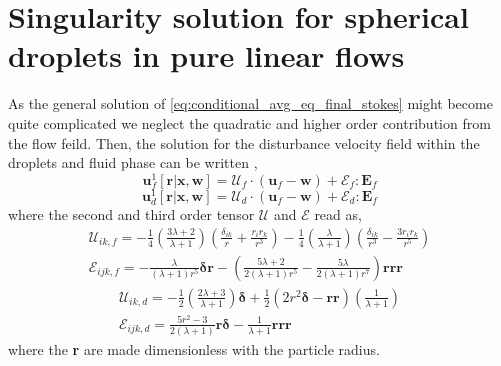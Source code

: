 
\section{Singularity solution for spherical droplets in pure linear flows}
\label{ap:solution_singularity}

As the general solution of \ref{eq:conditional_avg_eq_final_stokes} might become quite complicated we neglect the quadratic and higher order contribution from the flow feild. 
Then, the solution for the disturbance velocity field within the droplets and fluid phase can be written \citep{leal2007advanced}, 
\begin{equation}
    \textbf{u}_f^1[\textbf{r}|\textbf{x},\textbf{w}]
    = 
    \mathcal{U}_f\cdot (\textbf{u}_f - \textbf{w})
    + \mathcal{E}_f: \textbf{E}_{f}
\end{equation}
\begin{equation}
    \textbf{u}_d^1[\textbf{r}|\textbf{x},\textbf{w}]
    = 
    \mathcal{U}_d\cdot (\textbf{u}_f - \textbf{w})
    + \mathcal{E}_d: \textbf{E}_{f}
\end{equation}
where the second and third order tensor $\mathcal{U}$ and $\mathcal{E}$ read as, 
\begin{align}
    \mathcal{U}_{ik,f} = 
    -\frac{1}{4}\left(\frac{3\lambda + 2}{\lambda +1}\right)
    \left(\frac{\delta_{ik}}{r} + \frac{r_ir_k}{r^3}\right) 
    - 
    \frac{1}{4}\left(\frac{\lambda}{\lambda +1}\right)
    \left(\frac{\delta_{ik}}{r^3} - \frac{3r_ir_k}{r^5}\right)  \\
    \mathcal{E}_{ijk,f}
    =
    -\frac{\lambda}{(\lambda + 1)r^5} \bm\delta\textbf{r}
    -\left(\frac{5\lambda +2}{2(\lambda +1 )r^5} - \frac{5\lambda}{2(\lambda+1)r^7}\right) \textbf{rrr}
\end{align}
\begin{align}
    \mathcal{U}_{ik,d} = 
    -\frac{1}{2}\left(\frac{2\lambda +3}{\lambda +1}\right)\bm\delta
    +\frac{1}{2} (2r^2 \bm\delta - \textbf{rr})
    \left(\frac{1}{\lambda +1}\right)\\
    \mathcal{E}_{ijk,d}
    =
    \frac{5r^2 -3}{2(\lambda +1)} \textbf{r}\bm\delta
    - \frac{1}{\lambda+1}\textbf{rrr}
\end{align}
where the \textbf{r} are made dimensionless with the particle radius. 

